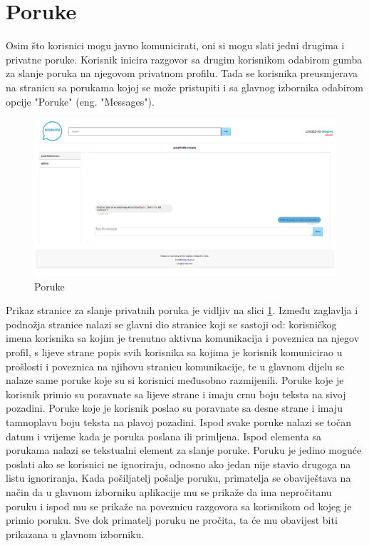 \documentclass{foi}
\begin{document}
\section{Poruke}

Osim što korisnici mogu javno komunicirati, oni si mogu slati jedni drugima i privatne poruke. Korisnik inicira razgovor sa drugim korisnikom odabirom gumba za slanje poruka na njegovom privatnom profilu. Tada se korisnika preusmjerava na stranicu sa porukama kojoj se može pristupiti i sa glavnog izbornika odabirom opcije "Poruke" (eng. "Messages"). 

\begin{figure}[h!]
    \centering
    \includegraphics[width=1\textwidth]{slike/poruke.png}
    \caption{Poruke}
    \label{poruke}
\end{figure}

Prikaz stranice za slanje privatnih poruka je vidljiv na slici \ref{poruke}. Između zaglavlja i podnožja stranice nalazi se glavni dio stranice koji se sastoji od: korisničkog imena korisnika sa kojim je trenutno aktivna komunikacija i poveznica na njegov profil, s lijeve strane popis svih korisnika sa kojima je korisnik komunicirao u prošlosti i poveznica na njihovu stranicu komunikacije, te u glavnom dijelu se nalaze same poruke koje su si korisnici međusobno razmijenili. Poruke koje je korisnik primio su poravnate sa lijeve strane i imaju crnu boju teksta na sivoj pozadini. Poruke koje je korisnik poslao su poravnate sa desne strane i imaju tamnoplavu boju teksta na plavoj pozadini. Ispod svake poruke nalazi se točan datum i vrijeme kada je poruka poslana ili primljena. Ispod elementa sa porukama nalazi se tekstualni element za slanje poruke. Poruku je jedino moguće poslati ako se korisnici ne ignoriraju, odnosno ako jedan nije stavio drugoga na listu ignoriranja. Kada pošiljatelj pošalje poruku, primatelja se obaviještava na način da u glavnom izborniku aplikacije mu se prikaže da ima nepročitanu poruku i ispod mu se prikaže na poveznicu razgovora sa korisnikom od kojeg je primio poruku. Sve dok primatelj poruku ne pročita, ta će mu obavijest biti prikazana u glavnom izborniku.
\end{document}
